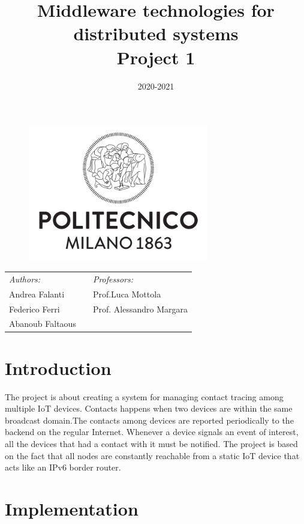 \documentclass[10pt]{article}
\title{Middleware technologies for distributed systems\\Project 1}
\date{2020-2021}
\begin{document}
	\begin{titlepage}
		\begin{figure}[t]
			\centering\includegraphics[width=0.7\textwidth]{../../docResources/logo_polimi}
		\end{figure}
		\maketitle
		
		\large
		\begin{tabularx}{\linewidth}{@{}lXl@{}}
			\textit{Authors:}  & & \textit{Professors:} \\
			Andrea Falanti      & & Prof.\@ Luca Mottola\\
			Federico Ferri  & & Prof. Alessandro Margara\\
			Abanoub Faltaous & & \\
		\end{tabularx}		
		\thispagestyle{empty}
	\end{titlepage}
	
	\tableofcontents
	\newpage
	
	\section{Introduction}
	The project is about creating a system for managing contact tracing among multiple IoT devices. Contacts happens when two devices are within the same broadcast domain.The contacts among devices are reported periodically to the backend on the regular Internet. Whenever a device signals an event of interest, all the devices that had a contact with it must be notified. The project is based on the fact that all nodes are constantly reachable from a static IoT device that acts like an IPv6 border router.   
	
	
	\section{Implementation}
\end{document}
